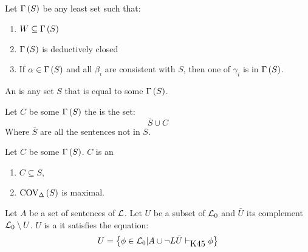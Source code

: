 \begin{defi}
Let $\Gamma\left(S\right)$ be any least set such that:
\begin{enumerate}
 \item $W\subseteq\Gamma\left(S\right)$
 \item $\Gamma\left(S\right)$ is deductively closed
 \item If $\alpha\in\Gamma\left(S\right)$ and all $\beta_i$ are consistent with $S$, then one of $\gamma_i$ is in $\Gamma\left(S\right)$.
\end{enumerate}
An  is any set $S$ that is equal to some $\Gamma\left(S\right)$.
\cite{conf/ijcai/BrewkaK93}
\end{defi}

\begin{defi}
Let $C$ be some $\Gamma\left(S\right)$ the  is the set:
\begin{equation}
\bar{S}\cup C
\end{equation}
Where $\bar{S}$ are all the sentences not in $S$.
\cite{conf/ijcai/BrewkaK93}
\end{defi}

\begin{defi}
Let $C$ be some $\Gamma\left(S\right)$. $C$ is an  \iffTx{}
\begin{enumerate}
 \item $C\subseteq S$,
 \item $\mbox{COV}_\Delta\left(S\right)$ is maximal.
\end{enumerate}
\cite{conf/ijcai/BrewkaK93}
\end{defi}

\begin{defi}
Let $A$ be a set of sentences of $\mathcal{L}$. Let $U$ be a subset of $\mathcal{L}_0$ and $\bar{U}$ its complement $\mathcal{L}_0\setminus U$. $U$ is a  \iffTx{} it satisfies the equation:
\begin{equation}
U=\left\{ \phi\in\mathcal{L}_0|A\cup\neg L\bar{U}\vdash_{\mbox{K45}}\phi\right\}
\end{equation}
\cite{conf/ijcai/BrewkaK93}
\end{defi}

